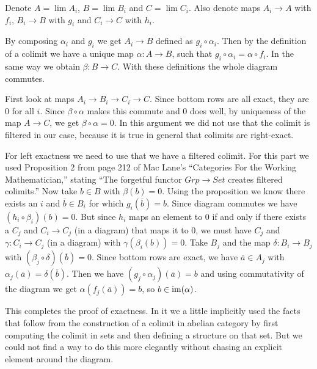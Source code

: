 \begin{exercise}{2}
    Denote $A = \lim A_i$, $B = \lim B_i$ and $C = \lim C_i$. Also denote maps
    $A_i \rightarrow A$ with $f_i$, $B_i \rightarrow B$ with $g_i$ and $C_i
    \rightarrow C$ with $h_i$.

    By composing $\alpha_i$ and $g_i$ we get $A_i \rightarrow B$ defined as $g_i
    \circ \alpha_i$. Then by the definition of a colimit we have a unique map $\alpha:A
    \rightarrow B$, such that $g_i \circ \alpha_i = \alpha
    \circ f_i$. In the same way we obtain $\beta \colon B \rightarrow C$. With
    these definitions the whole diagram commutes.

    First look at maps $A_i \rightarrow B_i \rightarrow C_i \rightarrow C$.
    Since bottom rows are all exact, they are $0$ for all $i$. Since $\beta
    \circ \alpha$ makes this commute and $0$ does well, by uniqueness of the map
    $A \rightarrow C$, we get $\beta \circ \alpha = 0$. In this argument we did
    not use that the colimit is filtered in our case, because it is true in
    general that colimits are right-exact.

    For left exactness we need to use that we have a filtered colimit.
    For this part we used Proposition 2 from page 212 of Mac Lane's ``Categories For
    the Working Mathematician,'' stating ``The forgetful functor $Grp \rightarrow
    Set$ creates filtered colimits.''
    Now take $b \in B$ with $\beta(b) = 0$. Using the proposition we know there
    exists an $i$ and $\overline{b} \in B_i$ for which $g_i(\overline{b}) = b$.
    Since diagram commutes we have $(h_i \circ \beta_i)(b) = 0$. But since $h_i$
    maps an element to $0$ if and only if there exists a $C_j$ and $C_i
    \rightarrow C_j$ (in a diagram) that maps it to $0$, we must have $C_j$ and
    $\gamma \colon C_i \rightarrow C_j$ (in a diagram) with $\gamma(\beta_i(b))
    = 0$. Take $B_j$ and the map $\delta \colon B_i \rightarrow B_j$ with
    $(\beta_j \circ \delta)(\overline{b}) = 0$. Since bottom rows are exact, we
    have $\overline{a} \in A_j$ with $\alpha_j(\overline{a}) =
    \delta(\overline{b})$. Then we have $(g_j \circ \alpha_j)(\overline{a}) =
    b$ and using commutativity of the diagram we get $\alpha(f_j(\overline{a}))
    = b$, so $b \in \operatorname{im}(\alpha)$.

    This completes the proof of exactness. In it we a little implicitly used the
    facts that follow from the construction of a colimit in abelian category by
    first computing the colimit in sets and then defining a structure on that
    set. But we could not find a way to do this more elegantly without chasing
    an explicit element around the diagram.
\end{exercise}


